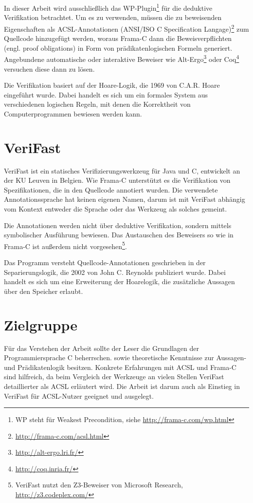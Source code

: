 In dieser Arbeit wird ausschließlich das WP-Plugin\footnote{WP steht für Weakest Precondition, siehe
\url{http://frama-c.com/wp.html}} für die deduktive Verifikation betrachtet. Um es zu verwenden, müssen die zu beweisenden 
Eigenschaften als ACSL-Annotationen (ANSI/ISO C Specification Langage)\footnote{\url{http://frama-c.com/acsl.html}} zum Quellcode hinzugefügt werden, woraus Frama-C dann die 
Beweisverpflichten (engl. proof obligations) in Form von prädikatenlogischen Formeln generiert. Angebundene automatische oder 
interaktive Beweiser wie Alt-Ergo\footnote{\url{http://alt-ergo.lri.fr/}} oder Coq\footnote{\url{http://coq.inria.fr/}}
versuchen diese dann zu lösen.

Die Verifikation basiert auf der Hoare-Logik, die 1969 von C.A.R. Hoare eingeführt wurde\cite{hoare}. Dabei
handelt es sich um ein formales System aus verschiedenen logischen Regeln, mit denen die Korrektheit von
Computerprogrammen bewiesen werden kann.


\section{VeriFast}
\label{sec:VeriFast}

VeriFast ist ein statisches Verifizierungswerkzeug für Java und C, entwickelt an der KU Leuven in Belgien.
Wie Frama-C unterstützt es die Verifikation von Spezifikationen, die in den Quellcode annotiert wurden. Die verwendete
Annotationssprache hat keinen eigenen Namen, darum ist mit \glqq VeriFast\grqq{} abhängig vom Kontext entweder die Sprache oder das
Werkzeug als solches gemeint.

Die Annotationen werden nicht über deduktive Verifikation, sondern mittels symbolischer Ausführung bewiesen. Das Austauschen
des Beweisers so wie in Frama-C ist außerdem nicht vorgesehen\footnote{VeriFast nutzt den Z3-Beweiser von Microsoft Research,
\url{http://z3.codeplex.com/}}.

Das Programm versteht Quellcode-Annotationen geschrieben in der Separierungslogik, die 2002 von John C. Reynolds publiziert
wurde\cite{reynolds-2002}. Dabei handelt es sich um eine Erweiterung der Hoarelogik, die zusätzliche Aussagen über den Speicher
erlaubt.


\section{Zielgruppe}
\label{sec:zielgruppe}

Für das Verstehen der Arbeit sollte der Leser die Grundlagen der Programmiersprache C beherrschen.
sowie theoretische Kenntnisse zur Aussagen- und Prädikatenlogik besitzen.
Konkrete Erfahrungen mit ACSL und Frama-C sind hilfreich, da beim Vergleich der Werkzeuge an vielen
Stellen VeriFast detaillierter als ACSL erläutert wird. Die Arbeit ist darum auch als Einstieg in VeriFast
für ACSL-Nutzer geeignet und ausgelegt.

 

